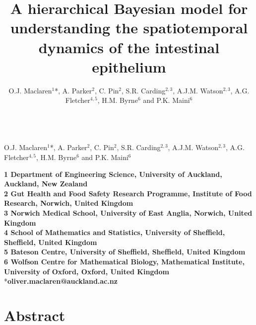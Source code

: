 \documentclass[10pt,letterpaper]{article}
\date{}
\title{A hierarchical Bayesian model for understanding the spatiotemporal %
dynamics of the intestinal epithelium}
\author{O.J. Maclaren\(^1\)*, A. Parker\(^2\), C. Pin\(^2\), S.R.
Carding\(^{2,3}\), A.J.M. Watson\(^{2,3}\), A.G. Fletcher\(^{4,5}\),
H.M. Byrne\(^6\) and P.K. Maini\(^6\)}
\date{}
\providecommand{\DIFaddbegin}{} %
\providecommand{\DIFaddend}{} %
\providecommand{\DIFdelbegin}{} %
\providecommand{\DIFdelend}{} %
\begin{document}
\vspace*{0.35in}
\begin{flushleft}
{\Large
\textbf\DIFdelbegin %
\DIFdelend \DIFaddbegin {}
\DIFaddend }
\newline
\\
O.J. Maclaren\(^1\)*, A. Parker\(^2\), C. Pin\(^2\), S.R.
Carding\(^{2,3}\), A.J.M. Watson\(^{2,3}\), A.G. Fletcher\(^{4,5}\),
H.M. Byrne\(^6\) and P.K. Maini\(^6\)
\end{flushleft}


\textbf{1 Department of Engineering Science, University of Auckland,
Auckland, New Zealand}\\
\textbf{2 Gut Health and Food Safety Research Programme, Institute of
Food Research, Norwich, United Kingdom}\\
\textbf{3 Norwich Medical School, University of East Anglia, Norwich,
United Kingdom}\\
\textbf{4 School of Mathematics and Statistics, University of Sheffield,
Sheffield, United Kingdom}\\
\textbf{5 Bateson Centre, University of Sheffield, Sheffield, United
Kingdom}\\
\textbf{6 Wolfson Centre for Mathematical Biology, Mathematical
Institute, University of Oxford, Oxford, United Kingdom}\\
*\textbf{oliver.maclaren@auckland.ac.nz}

\section{Abstract}\label{abstract}
\end{document}
